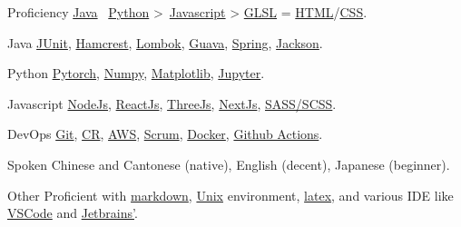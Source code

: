 
\begin{cvskills}
  \cvskill
    {Proficiency}
    {\href{https://www.java.com/en/}{Java} \approx\, \href{https://www.python.org/}{Python} >\, \href{https://www.javascript.com/}{Javascript} > \href{https://www.khronos.org/opengl/wiki/OpenGL_Shading_Language}{GLSL} = \href{https://developer.mozilla.org/en-US/docs/Glossary/HTML5}{HTML}/\href{https://developer.mozilla.org/en-US/docs/Web/CSS}{CSS}.}
  
  \cvskill
    {Java} %
    {\href{https://junit.org/junit4/}{JUnit}, \href{http://hamcrest.org/JavaHamcrest/index}{Hamcrest}, \href{https://projectlombok.org/}{Lombok}, \href{https://github.com/google/guava}{Guava}, \href{https://spring.io/}{Spring}, \href{https://github.com/FasterXML/jackson}{Jackson}.}  %

  \cvskill
    {Python} %
    {\href{https://pytorch.org/}{Pytorch}, \href{https://numpy.org/}{Numpy}, \href{https://matplotlib.org/}{Matplotlib}, \href{https://jupyter.org/}{Jupyter}.}  %

  \cvskill
    {Javascript} %
    {\href{https://nodejs.org/en/}{NodeJs}, \href{https://reactjs.org/}{ReactJs}, \href{https://threejs.org/}{ThreeJs}, \href{https://nextjs.org/}{NextJs}, \href{https://sass-lang.com/}{SASS/SCSS}.}
  
  \cvskill
    {DevOps} %
    {\href{https://git-scm.com/}{Git}, \href{https://en.wikipedia.org/wiki/Code_review}{CR}, \href{https://aws.amazon.com/}{AWS}, \href{https://www.scrum.org/resources/what-is-scrum}{Scrum}, \href{https://www.docker.com/}{Docker}, \href{https://github.com/features/actions}{Github Actions}.}
 
  \cvskill
    {Spoken}
    {Chinese and Cantonese (native), English (decent), Japanese (beginner).}

  \cvskill
    {Other} %
    {Proficient with \href{https://en.wikipedia.org/wiki/Markdown}{markdown}, \href{https://en.wikipedia.org/wiki/Unix}{Unix} environment, \href{https://www.latex-project.org/}{latex}, and various IDE like \href{https://code.visualstudio.com/}{VSCode} and \href{https://www.jetbrains.com/}{Jetbrains'}.}

\end{cvskills}
